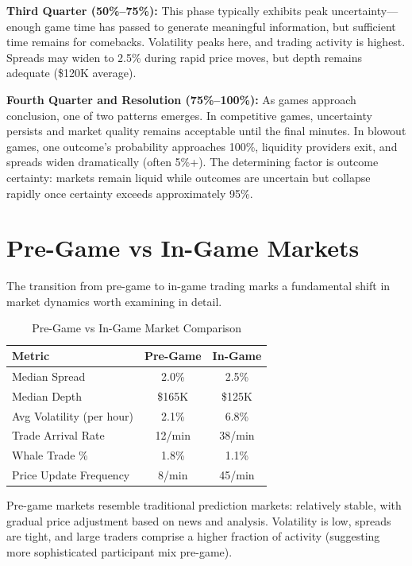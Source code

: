 \textbf{Third Quarter (50\%--75\%):} This phase typically exhibits peak uncertainty---enough game time has passed to generate meaningful information, but sufficient time remains for comebacks. Volatility peaks here, and trading activity is highest. Spreads may widen to 2.5\% during rapid price moves, but depth remains adequate (\$120K average).

\textbf{Fourth Quarter and Resolution (75\%--100\%):} As games approach conclusion, one of two patterns emerges. In competitive games, uncertainty persists and market quality remains acceptable until the final minutes. In blowout games, one outcome's probability approaches 100\%, liquidity providers exit, and spreads widen dramatically (often 5\%+). The determining factor is outcome certainty: markets remain liquid while outcomes are uncertain but collapse rapidly once certainty exceeds approximately 95\%.

\section{Pre-Game vs In-Game Markets}

The transition from pre-game to in-game trading marks a fundamental shift in market dynamics worth examining in detail.

\begin{table}[H]
\centering
\caption{Pre-Game vs In-Game Market Comparison}
\label{tab:pregame-ingame}
\begin{tabular}{lcc}
\toprule
\textbf{Metric} & \textbf{Pre-Game} & \textbf{In-Game} \\
\midrule
Median Spread & 2.0\% & 2.5\% \\
Median Depth & \$165K & \$125K \\
Avg Volatility (per hour) & 2.1\% & 6.8\% \\
Trade Arrival Rate & 12/min & 38/min \\
Whale Trade \% & 1.8\% & 1.1\% \\
Price Update Frequency & 8/min & 45/min \\
\bottomrule
\end{tabular}
\end{table}

Pre-game markets resemble traditional prediction markets: relatively stable, with gradual price adjustment based on news and analysis. Volatility is low, spreads are tight, and large traders comprise a higher fraction of activity (suggesting more sophisticated participant mix pre-game).


